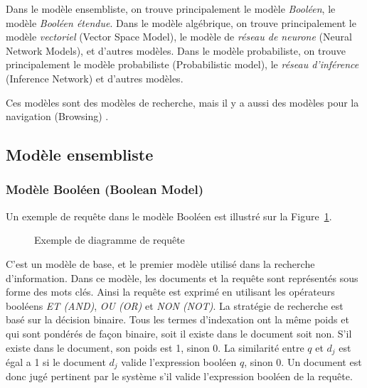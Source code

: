 Dans le modèle ensembliste, on trouve principalement le modèle \emph{Booléen}, le modèle \emph{Booléen étendue}. Dans le modèle algébrique, on trouve principalement le modèle \emph{vectoriel} (Vector Space Model), le modèle de \emph{réseau de neurone} (Neural Network Models), et d'autres modèles. Dans le modèle probabiliste, on trouve principalement le modèle probabiliste (Probabilistic model), le \emph{réseau d'inférence} (Inference Network) et d'autres modèles.

Ces modèles sont des modèles de recherche, mais il y a aussi des modèles pour la navigation (Browsing) \citep{modern-ir}.

\subsection{Modèle ensembliste}
\subsubsection{Modèle Booléen (Boolean Model)}
Un exemple de requête dans le modèle Booléen est illustré sur la Figure~\ref{fig:boolean-model}.

\begin{figure}[htbp]
    \begin{center}
    \end{center}
    \caption{Exemple de diagramme de requête \citep{model-ir}}\label{fig:boolean-model}
\end{figure}

C'est un modèle de base, et le premier modèle utilisé dans la recherche d'information. Dans ce modèle, les documents et la requête sont représentés sous forme des mots clés. Ainsi la requête est exprimé en utilisant les opérateurs booléens \emph{ET (AND)}, \emph{OU (OR)} et \emph{NON (NOT)}. La stratégie de recherche est basé sur la décision binaire. Tous les termes d'indexation ont la même poids et qui sont pondérés de façon binaire, soit il existe dans le document soit non. S'il existe dans le document, son poids est 1, sinon 0. La similarité entre $q$ et $d_{j}$ est égal a 1 si le document $d_{j}$ valide l'expression booléen $q$, sinon 0. Un document est donc jugé pertinent par le système s'il valide l'expression booléen de la requête.


